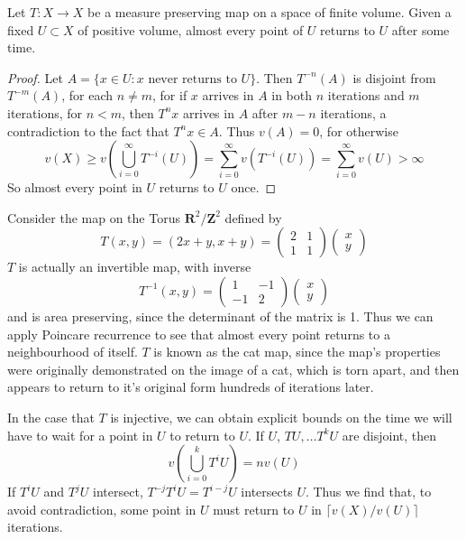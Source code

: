 \begin{theorem}
    Let $T: X \to X$ be a measure preserving map on a space of finite volume. Given a fixed $U \subset X$ of positive volume, almost every point of $U$ returns to $U$ after some time.
\end{theorem}
\begin{proof}
    Let $A = \{ x \in U : \text{$x$ never returns to $U$} \}$. Then $T^{-n}(A)$ is disjoint from $T^{-m}(A)$, for each $n \neq m$, for if $x$ arrives in $A$ in both $n$ iterations and $m$ iterations, for $n < m$, then $T^n x$ arrives in $A$ after $m - n$ iterations, a contradiction to the fact that $T^n x \in A$. Thus $v(A) = 0$, for otherwise
    \[ v(X) \geq v\left( \bigcup_{i = 0}^\infty T^{-i}(U) \right) = \sum_{i = 0}^\infty v(T^{-i}(U)) = \sum_{i = 0}^\infty v(U) > \infty \]
    So almost every point in $U$ returns to $U$ once.
\end{proof}

\begin{example}
    Consider the map on the Torus $\mathbf{R}^2 / \mathbf{Z}^2$ defined by
    \[ T(x,y) = (2x + y, x + y) = \begin{pmatrix} 2 & 1 \\ 1 & 1 \end{pmatrix} \begin{pmatrix} x \\ y \end{pmatrix} \]
    $T$ is actually an invertible map, with inverse
    \[ T^{-1}(x,y) = \begin{pmatrix} 1 & -1 \\ -1 & 2 \end{pmatrix} \begin{pmatrix} x \\ y \end{pmatrix} \]
    and is area preserving, since the determinant of the matrix is 1. Thus we can apply Poincare recurrence to see that almost every point returns to a neighbourhood of itself. $T$ is known as the cat map, since the map's properties were originally demonstrated on the image of a cat, which is torn apart, and then appears to return to it's original form hundreds of iterations later.
\end{example}

In the case that $T$ is injective, we can obtain explicit bounds on the time we will have to wait for a point in $U$ to return to $U$. If $U$, $T U, \dots T^k U$ are disjoint, then
%
\[ v \left( \bigcup_{i = 0}^k T^i U \right) = n v(U) \]
%
If $T^iU$ and $T^jU$ intersect, $T^{-j}T^iU = T^{i-j}U$ intersects $U$. Thus we find that, to avoid contradiction, some point in $U$ must return to $U$ in $\lceil v(X)/v(U) \rceil$ iterations.

